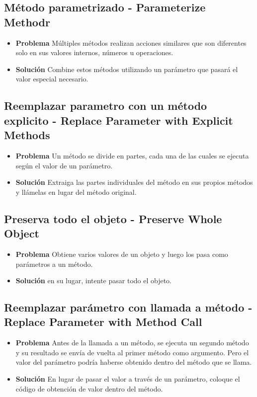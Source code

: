 \documentclass[11pt,a4paper,oneside]{book}
\begin{document}
\subsection{Método parametrizado - Parameterize Methodr}
\label{metodoparametrizado}
\begin{itemize}
    \item \textbf{Problema} Múltiples métodos realizan acciones similares que son diferentes solo en sus valores internos, números u operaciones.
    \item \textbf{Solución} Combine estos métodos utilizando un parámetro que pasará el valor especial necesario.
\end{itemize}

\subsection{Reemplazar parametro con un método explicito - Replace Parameter with Explicit Methods}
\label{reemplazarparametrometodoexplicito}
\begin{itemize}
    \item \textbf{Problema} Un método se divide en partes, cada una de las cuales se ejecuta según el valor de un parámetro.
    \item \textbf{Solución} Extraiga las partes individuales del método en sus propios métodos y llámelas en lugar del método original.
\end{itemize}

\subsection{Preserva todo el objeto - Preserve Whole Object}
\label{preservatodoelobjeto}
\begin{itemize}
    \item \textbf{Problema} Obtiene varios valores de un objeto y luego los pasa como parámetros a un método.
    \item \textbf{Solución} en su lugar, intente pasar todo el objeto.
\end{itemize}
    


\subsection{Reemplazar parámetro con llamada a método - Replace Parameter with Method Call}
\label{reemplazarparametrollamadametodo}
\begin{itemize}
    \item \textbf{Problema} Antes de la llamada a un método, se ejecuta un segundo método y su resultado se envía de vuelta al primer método como argumento. Pero el valor del parámetro podría haberse obtenido dentro del método que se llama.
    \item \textbf{Solución} En lugar de pasar el valor a través de un parámetro, coloque el código de obtención de valor dentro del método.
\end{itemize}
\end{document}
